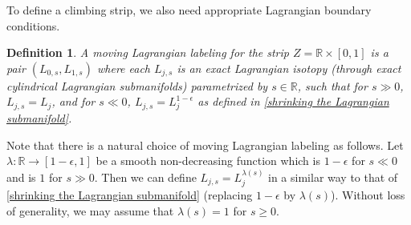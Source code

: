 \documentclass{amsart}
\newtheorem{definition}[theorem]{Definition}
\numberwithin{equation}{section}
\numberwithin{figure}{section}
\begin{document}
	To define a climbing strip, we also need appropriate Lagrangian boundary conditions. \par

\begin{definition}\label{moving Lagrangian labeling}
	A moving Lagrangian labeling for the strip $Z = \mathbb{R} \times [0, 1]$ is a pair $(L_{0, s}, L_{1, s})$ where each $L_{j, s}$ is an exact Lagrangian isotopy (through exact cylindrical Lagrangian submanifolds) parametrized by $s \in \mathbb{R}$, such that for $s \gg 0$, $L_{j, s} = L_{j}$, and for $s \ll 0$, $L_{j, s} = L_{j}^{1-\epsilon}$ as defined in \eqref{shrinking the Lagrangian submanifold}.
\end{definition}

	Note that there is a natural choice of moving Lagrangian labeling as follows. Let $\lambda: \mathbb{R} \to [1-\epsilon, 1]$ be a smooth non-decreasing function which is $1-\epsilon$ for $s \ll 0$ and is $1$ for $s \gg 0$. Then we can define $L_{j, s} = L_{j}^{\lambda(s)}$ in a similar way to that of \eqref{shrinking the Lagrangian submanifold} (replacing $1-\epsilon$ by $\lambda(s)$). Without loss of generality, we may assume that $\lambda(s) = 1$ for $s \ge 0$. \par
\end{document}
